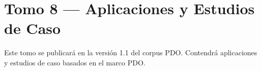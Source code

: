 \documentclass{article}
\begin{document}
\section*{Tomo 8 — Aplicaciones y Estudios de Caso}
Este tomo se publicará en la versión 1.1 del corpus PDO. Contendrá aplicaciones y estudios de caso basados en el marco PDO.
\end{document}

